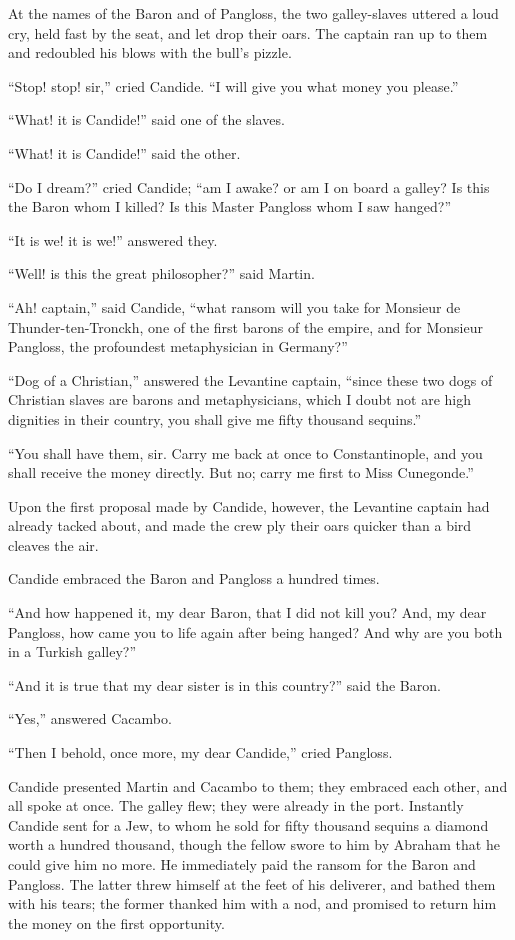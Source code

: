 At the names of the Baron and of Pangloss, the two galley-slaves uttered a loud cry, held fast by the seat, and let drop their oars. The captain ran up to them and redoubled his blows with the bull's pizzle.

``Stop! stop! sir,'' cried Candide. ``I will give you what money you please.''

``What! it is Candide!'' said one of the slaves.

``What! it is Candide!'' said the other.

``Do I dream?'' cried Candide; ``am I awake? or am I on board a galley? Is this the Baron whom I killed? Is this Master Pangloss whom I saw hanged?''

``It is we! it is we!'' answered they.

``Well! is this the great philosopher?'' said Martin.

``Ah! captain,'' said Candide, ``what ransom will you take for Monsieur de Thunder-ten-Tronckh, one of the first barons of the empire, and for Monsieur Pangloss, the profoundest metaphysician in Germany?''

``Dog of a Christian,'' answered the Levantine captain, ``since these two dogs of Christian slaves are barons and metaphysicians, which I doubt not are high dignities in their country, you shall give me fifty thousand sequins.''

``You shall have them, sir. Carry me back at once to Constantinople, and you shall receive the money directly. But no; carry me first to Miss Cunegonde.''

Upon the first proposal made by Candide, however, the Levantine captain had already tacked about, and made the crew ply their oars quicker than a bird cleaves the air.

Candide embraced the Baron and Pangloss a hundred times.

``And how happened it, my dear Baron, that I did not kill you? And, my dear Pangloss, how came you to life again after being hanged? And why are you both in a Turkish galley?''

``And it is true that my dear sister is in this country?'' said the Baron.

``Yes,'' answered Cacambo.

``Then I behold, once more, my dear Candide,'' cried Pangloss.

Candide presented Martin and Cacambo to them; they embraced each other, and all spoke at once. The galley flew; they were already in the port. Instantly Candide sent for a Jew, to whom he sold for fifty thousand sequins a diamond worth a hundred thousand, though the fellow swore to him by Abraham that he could give him no more. He immediately paid the ransom for the Baron and Pangloss. The latter threw himself at the feet of his deliverer, and bathed them with his tears; the former thanked him with a nod, and promised to return him the money on the first opportunity.

